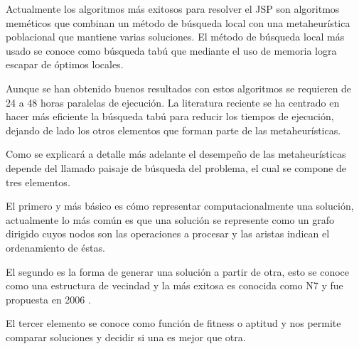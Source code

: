 Actualmente los algoritmos más exitosos para resolver el JSP son algoritmos meméticos que combinan un método de búsqueda local con una metaheurística poblacional que mantiene varias soluciones. El método de búsqueda local más usado se conoce como búsqueda tabú que mediante el uso de memoria logra escapar de óptimos locales.

Aunque se han obtenido buenos resultados con estos algoritmos se requieren de 24 a 48 horas paralelas de ejecución. La literatura reciente se ha centrado en hacer más eficiente la búsqueda tabú para reducir los tiempos de ejecución, dejando de lado los otros elementos que forman parte de las metaheurísticas. 

Como se explicará a detalle más adelante el desempeño de las metaheurísticas depende del llamado paisaje de búsqueda del problema, el cual se compone de tres elementos.

El primero y más básico es cómo representar computacionalmente una solución, actualmente lo más común es que una solución se represente como un grafo dirigido cuyos nodos son las operaciones a procesar y las aristas indican el ordenamiento de éstas.

El segundo es la forma de generar una solución a partir de otra, esto se conoce como una estructura de vecindad y la más exitosa es conocida como N7 y fue propuesta en 2006 \cite{Zhang2007}. 

El tercer elemento se conoce como función de fitness o aptitud y nos permite comparar soluciones y decidir si una es mejor que otra. 


